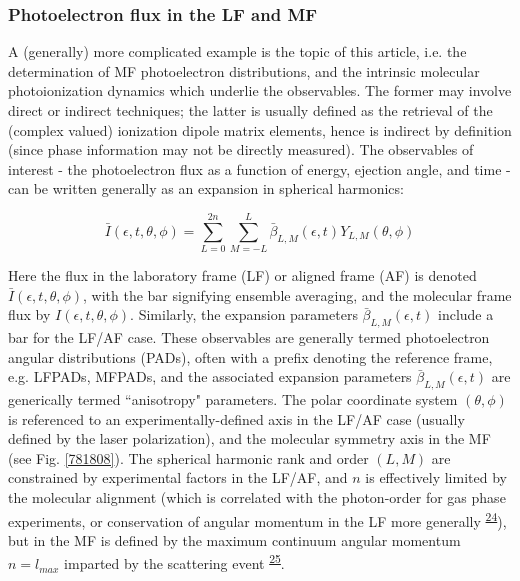 \documentclass[10pt]{article}
\begin{document}
\subsubsection{Photoelectron flux in the LF and MF}

A (generally) more complicated example is the topic of this article, i.e. the determination of MF photoelectron distributions, and the intrinsic molecular photoionization dynamics which underlie the observables.  The former may involve direct or indirect techniques; the latter is usually defined as the retrieval of the (complex valued) ionization dipole matrix elements, hence is indirect by definition (since phase information may not be directly measured). The observables of interest - the photoelectron flux as a function of energy, ejection angle, and time - can be written generally as an expansion in spherical harmonics:

\begin{equation}
\bar{I}(\epsilon,t,\theta,\phi)=\sum_{L=0}^{2n}\sum_{M=-L}^{L}\bar{\beta}_{L,M}(\epsilon,t)Y_{L,M}(\theta,\phi)\label{eq:AF-PAD-general}
\end{equation}

Here the flux in the laboratory frame (LF) or aligned frame (AF) is denoted $\bar{I}(\epsilon,t,\theta,\phi)$, with the bar signifying ensemble averaging, and the molecular frame flux by $I(\epsilon,t,\theta,\phi)$.  Similarly, the expansion parameters $\bar{\beta}_{L,M}(\epsilon,t)$ include a bar for the LF/AF case. These observables are generally termed photoelectron angular distributions (PADs), often with a prefix denoting the reference frame, e.g. LFPADs, MFPADs, and the associated expansion parameters $\bar{\beta}_{L,M}(\epsilon,t)$ are generically termed ``anisotropy" parameters. The polar coordinate system $(\theta,\phi)$ is referenced to an experimentally-defined axis in the LF/AF case (usually defined by the laser polarization), and the molecular symmetry axis in the MF (see Fig. \ref{781808}). The spherical harmonic rank and order $(L,M)$ are constrained by experimental factors in the LF/AF, and $n$ is effectively limited by the molecular alignment (which is correlated with the photon-order for gas phase experiments, or conservation of angular momentum in the LF more generally \textsuperscript{\hyperref[csl:24]{24}}), but in the MF is defined by the maximum continuum angular momentum $n=l_{max}$ imparted by the scattering event \textsuperscript{\hyperref[csl:25]{25}}. 
\end{document}
